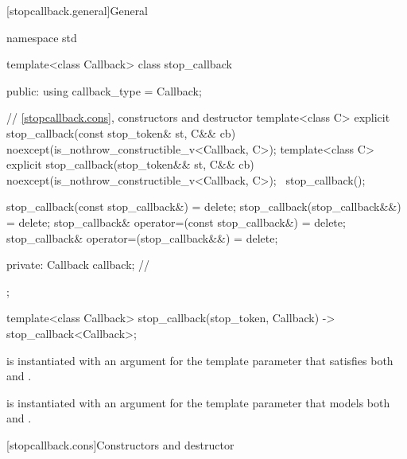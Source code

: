 [stopcallback.general]{General}

\pnum
{}%
\begin{codeblock}
namespace std {
  template<class Callback>
  class stop_callback {
  public:
    using callback_type = Callback;

    // \ref{stopcallback.cons}, constructors and destructor
    template<class C>
      explicit stop_callback(const stop_token& st, C&& cb)
        noexcept(is_nothrow_constructible_v<Callback, C>);
    template<class C>
      explicit stop_callback(stop_token&& st, C&& cb)
        noexcept(is_nothrow_constructible_v<Callback, C>);
    ~stop_callback();

    stop_callback(const stop_callback&) = delete;
    stop_callback(stop_callback&&) = delete;
    stop_callback& operator=(const stop_callback&) = delete;
    stop_callback& operator=(stop_callback&&) = delete;

  private:
    Callback callback;      // \expos
  };

  template<class Callback>
    stop_callback(stop_token, Callback) -> stop_callback<Callback>;
}
\end{codeblock}

\pnum
\mandates
{} is instantiated with an argument for the
template parameter 
that satisfies both 
and .

\pnum
\expects
{} is instantiated with an argument for the
template parameter 
that models both 
and .


[stopcallback.cons]{Constructors and destructor}

